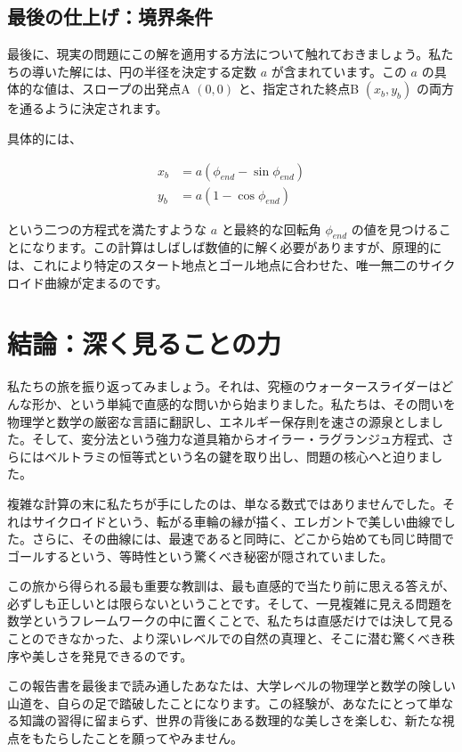 \documentclass[12pt,a4paper]{ltjsarticle}
\begin{document}
\subsection{最後の仕上げ：境界条件}

最後に、現実の問題にこの解を適用する方法について触れておきましょう。私たちの導いた解には、円の半径を決定する定数 $a$ が含まれています。この $a$ の具体的な値は、スロープの出発点A $(0,0)$ と、指定された終点B $(x_b, y_b)$ の両方を通るように決定されます。

具体的には、

\begin{align}
x_b &= a(\phi_{end} - \sin\phi_{end}) \\
y_b &= a(1 - \cos\phi_{end})
\end{align}

という二つの方程式を満たすような $a$ と最終的な回転角 $\phi_{end}$ の値を見つけることになります。この計算はしばしば数値的に解く必要がありますが、原理的には、これにより特定のスタート地点とゴール地点に合わせた、唯一無二のサイクロイド曲線が定まるのです。

\section{結論：深く見ることの力}

私たちの旅を振り返ってみましょう。それは、究極のウォータースライダーはどんな形か、という単純で直感的な問いから始まりました。私たちは、その問いを物理学と数学の厳密な言語に翻訳し、エネルギー保存則を速さの源泉としました。そして、変分法という強力な道具箱からオイラー・ラグランジュ方程式、さらにはベルトラミの恒等式という名の鍵を取り出し、問題の核心へと迫りました。

複雑な計算の末に私たちが手にしたのは、単なる数式ではありませんでした。それはサイクロイドという、転がる車輪の縁が描く、エレガントで美しい曲線でした。さらに、その曲線には、最速であると同時に、どこから始めても同じ時間でゴールするという、等時性という驚くべき秘密が隠されていました。

この旅から得られる最も重要な教訓は、最も直感的で当たり前に思える答えが、必ずしも正しいとは限らないということです。そして、一見複雑に見える問題を数学というフレームワークの中に置くことで、私たちは直感だけでは決して見ることのできなかった、より深いレベルでの自然の真理と、そこに潜む驚くべき秩序や美しさを発見できるのです。

この報告書を最後まで読み通したあなたは、大学レベルの物理学と数学の険しい山道を、自らの足で踏破したことになります。この経験が、あなたにとって単なる知識の習得に留まらず、世界の背後にある数理的な美しさを楽しむ、新たな視点をもたらしたことを願ってやみません。
\end{document}
